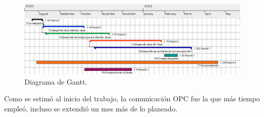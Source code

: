 \begin{figure}[htpb]
	\centering
	\includegraphics[width=14cm]{./Figures/gantt_1.png}
	\caption{Diagrama de Gantt\protect\footnotemark.}
	\label{figure:gantt}
\end{figure}

Como se estimó al inicio del trabajo, la comunicación OPC fue la que más tiempo empleó, incluso se extendió un mes más de lo planeado. 
